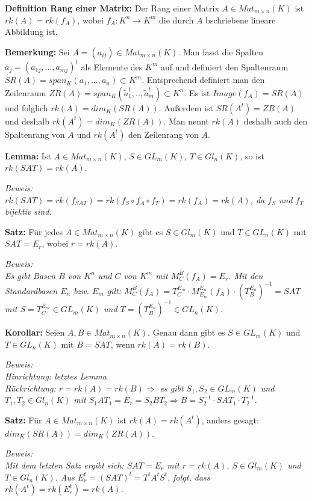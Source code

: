\documentclass[11pt]{article}
\begin{document}
		\begin{mdframed}[backgroundcolor=blue!20]
			\textbf{Definition Rang einer Matrix:} Der Rang einer Matrix $A\in Mat_{m\times n}(K)$ ist $rk(A)=rk(f_A)$, wobei $f_A:K^n\to K^m$ 
			die durch $A$ bschriebene lineare Abbildung ist.
		\end{mdframed}
		
		\textbf{Bemerkung:} Sei $A=(a_{ij})\in Mat_{m\times n}(K)$. Man fasst die Spalten $a_j=(a_{1j},...,a_{mj})^t$ als Elemente des $K^m$ auf 
		und definiert den Spaltenraum $SR(A)=span_K(a_1,...,a_n)\subset K^m$. Entsprechend definiert man den Zeilenraum $ZR(A)=span_K(
		\tilde a_1^t,..,\tilde a_m^t)\subset K^n$. Es ist $Image(f_A)=SR(A)$ und folglich $rk(A)=dim_K(SR(A))$. Außerdem ist $SR(A^t)=ZR(A)$ 
		und deshalb $rk(A^t)=dim_K(ZR(A))$. Man nennt $rk(A)$ deshalb auch den Spaltenrang von $A$ und $rk(A^t)$ den Zeilenrang von $A$.
		
		\begin{framed}
			\textbf{Lemma:} Ist $A\in Mat_{m\times n}(K)$, $S\in GL_m(K)$, $T\in Gl_n(K)$, so ist $rk(SAT)=rk(A)$.
		\end{framed}
		\textit{Beweis: \\
		$rk(SAT)=rk(f_{SAT})=rk(f_S\circ f_A\circ f_T)=rk(f_A)=rk(A)$, da $f_S$ und $f_T$ bijektiv sind.}
		
		\begin{framed}
			\textbf{Satz:} Für jedes $A\in Mat_{m\times n}(K)$ gibt es $S\in Gl_m(K)$ und $T\in GL_n(K)$ mit $SAT=E_r$, wobei $r=rk(A)$.
		\end{framed}
		\textit{Beweis: \\
		Es gibt Basen $B$ von $K^n$ und $C$ von $K^m$ mit $M_C^B(f_A)=E_r$. Mit den Standardbasen $E_n$ bzw. $E_m$ gilt: $M_C^B(f_A)=T_C^{E_m}
		\cdot M_{E_m}^{E_n}(f_A)\cdot (T_B^{E_n})^{-1}=SAT$ mit $S=T_C^{E_m}\in GL_m(K)$ und $T=(T_B^{E_n})^{-1}\in GL_n(K)$.}
		
		\begin{framed}
			\textbf{Korollar:} Seien $A,B\in Mat_{m\times n}(K)$. Genau dann gibt es $S\in GL_m(K)$ und $T\in GL_n(K)$ mit $B=SAT$, wenn 
			$rk(A)=rk(B)$.
		\end{framed}
		\textit{Beweis: \\
		Hinrichtung: letztes Lemma \\
		Rückrichtung: $r=rk(A)=rk(B)\Rightarrow$ es gibt $S_1,S_2\in GL_m(K)$ und $T_1,T_2\in Gl_n(K)$ mit $S_1AT_1=E_r=S_2BT_2 \Rightarrow 
		B=S_2^{-1}\cdot SAT_1\cdot T_2^{-1}$.}
		
		\begin{framed}
			\textbf{Satz:} Für $A\in Mat_{m\times n}(K)$ ist $rk(A)=rk(A^t)$, anders gesagt: $dim_K(SR(A))=dim_K(ZR(A))$.
		\end{framed}
		\textit{Beweis: \\
		Mit dem letzten Satz ergibt sich: $SAT=E_r$ mit $r=rk(A)$, $S\in Gl_m(K)$ und $T\in Gl_n(K)$. Aus $E_r^t=(SAT)^t=T^tA^tS^t$, folgt, 
		dass $rk(A^t)=rk(E_r^t)=rk(A)$.}
		
\end{document}
